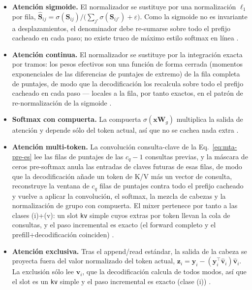 \begin{itemize}[leftmargin=*]
    \item \textbf{Atención sigmoide.} El normalizador se sustituye por una normalización $\ell_1$ por fila, $\hat{\mathbf{S}}_{ij} = \sigma(\mathbf{S}_{ij}) / \big(\sum_{j'}\sigma(\mathbf{S}_{ij'}) + \varepsilon\big)$. Como la sigmoide no es invariante a desplazamientos, el denominador debe re-sumarse sobre todo el prefijo cacheado en cada paso; no existe truco de máximo estilo softmax en línea \citep{ramapuram_theory_2024}.
    \item \textbf{Atención continua.} El normalizador se sustituye por la integración exacta por tramos: los pesos efectivos son una función de forma cerrada (momentos exponenciales de las diferencias de puntajes de extremo) de la fila completa de puntajes, de modo que la decodificación los recalcula sobre todo el prefijo cacheado en cada paso --- locales a la fila, por tanto exactos, en el patrón de re-normalización de la sigmoide \citep{khadangi_continuum_2026}.
    \item \textbf{Softmax con compuerta.} La compuerta $\sigma(\mathbf{x}\mathbf{W}_g)$ multiplica la salida de atención y depende sólo del token actual, así que no se cachea nada extra \citep{qiu_gated_attention_2025}.
    \item \textbf{Atención multi-token.} La convolución consulta-clave de la Eq.~\eqref{eq:mta-pre-es} lee las filas de puntajes de las $c_q-1$ consultas previas, y la máscara de ceros pre-softmax anula las entradas de claves futuras de esas filas, de modo que la decodificación añade un token de K/V más un vector de consulta, reconstruye la ventana de $c_q$ filas de puntajes contra todo el prefijo cacheado y vuelve a aplicar la convolución, el softmax, la mezcla de cabezas y la normalización de grupo con compuerta. El mixer pertenece por tanto a las clases (i)+(v): un slot \texttt{kv} simple cuyos extras por token llevan la cola de consultas, y el paso incremental es exacto (el forward completo y el prefill+decodificación coinciden) \citep{golovneva_multi_token_2025}.
    \item \textbf{Atención exclusiva.} Tras el append/read estándar, la salida de la cabeza se proyecta fuera del valor normalizado del token actual, $\mathbf{z}_i=\mathbf{y}_i-(\mathbf{y}_i^\top\hat{\mathbf{v}}_i)\hat{\mathbf{v}}_i$. La exclusión sólo lee $\mathbf{v}_i$, que la decodificación calcula de todos modos, así que el slot es un \texttt{kv} simple y el paso incremental es exacto (clase (i)) \citep{zhai_exclusive_2026}.

\end{itemize}
